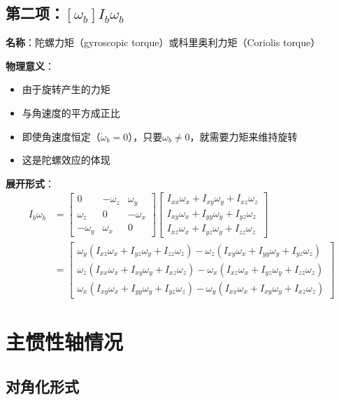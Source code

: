 \documentclass[12pt,a4paper]{article}
\begin{document}
\subsection{第二项：$[\omega_b] I_b \omega_b$}

\textbf{名称}：陀螺力矩（gyroscopic torque）或科里奥利力矩（Coriolis torque）

\textbf{物理意义}：
\begin{itemize}
\item 由于旋转产生的力矩
\item 与角速度的平方成正比
\item 即使角速度恒定（$\dot{\omega}_b = 0$），只要$\omega_b \neq 0$，就需要力矩来维持旋转
\item 这是陀螺效应的体现
\end{itemize}

\textbf{展开形式}：
\begin{align}
[\omega_b] I_b \omega_b &= \begin{bmatrix}
0 & -\omega_z & \omega_y \\
\omega_z & 0 & -\omega_x \\
-\omega_y & \omega_x & 0
\end{bmatrix} \begin{bmatrix}
I_{xx} \omega_x + I_{xy} \omega_y + I_{xz} \omega_z \\
I_{xy} \omega_x + I_{yy} \omega_y + I_{yz} \omega_z \\
I_{xz} \omega_x + I_{yz} \omega_y + I_{zz} \omega_z
\end{bmatrix} \\
&= \begin{bmatrix}
\omega_y (I_{xz} \omega_x + I_{yz} \omega_y + I_{zz} \omega_z) - \omega_z (I_{xy} \omega_x + I_{yy} \omega_y + I_{yz} \omega_z) \\
\omega_z (I_{xx} \omega_x + I_{xy} \omega_y + I_{xz} \omega_z) - \omega_x (I_{xz} \omega_x + I_{yz} \omega_y + I_{zz} \omega_z) \\
\omega_x (I_{xy} \omega_x + I_{yy} \omega_y + I_{yz} \omega_z) - \omega_y (I_{xx} \omega_x + I_{xy} \omega_y + I_{xz} \omega_z)
\end{bmatrix}
\end{align}

\section{主惯性轴情况}

\subsection{对角化形式}
\end{document}
